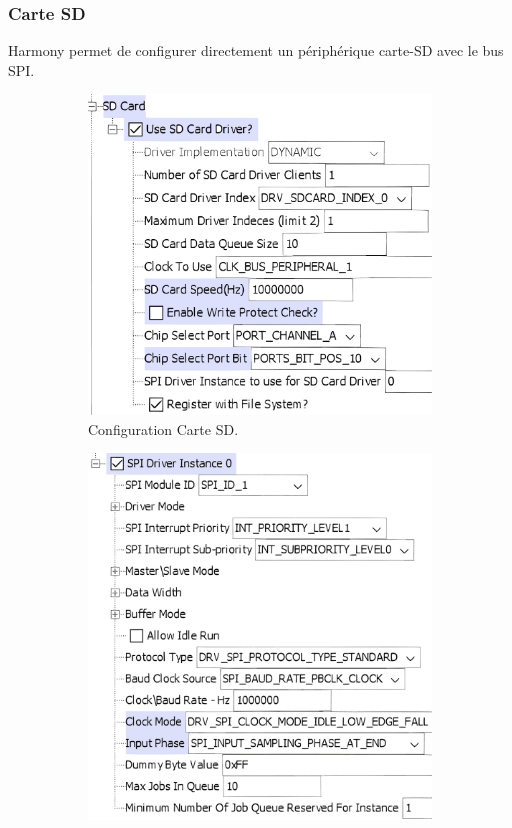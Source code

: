 \subsubsection{Carte SD}
Harmony permet de configurer directement un périphérique carte-SD avec le bus SPI.
\begin{figure}[!h]
	\centering
	\begin{subfigure}[b]{0.5\textwidth}
		\centering
		\includegraphics[width=\linewidth]{../figures/code/harmony/SD-card}
		\caption{Configuration Carte SD.}
		\label{fig:sd-card}
	\end{subfigure}
	\hfill
	\begin{subfigure}[b]{0.44\textwidth}
		\centering
		\includegraphics[width=\linewidth]{../figures/code/harmony/SD-card-spi}

\end{subfigure}
\end{figure}
